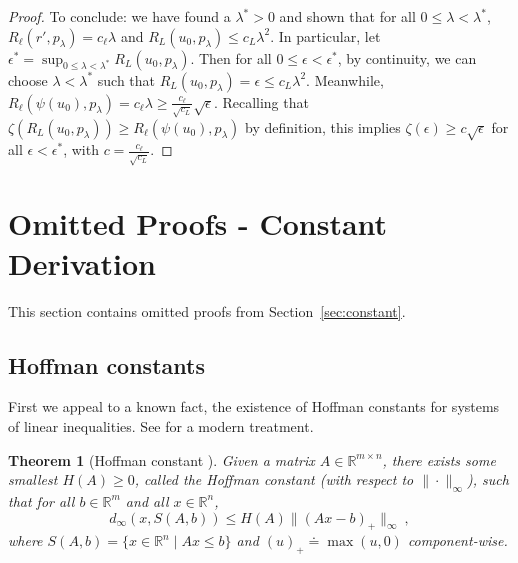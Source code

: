 \documentclass{article}
\newtheorem{theorem}{Theorem}
\theoremstyle{definition}\newtheorem{definition}{Definition}
\theoremstyle{definition}\newtheorem{assumption}{Assumption}
\newcommand{\reals}{\mathbb{R}}
\newcommand{\defeq}{\doteq}%
\begin{document}
\begin{proof}
  To conclude: we have found a $\lambda^* > 0$ and shown that for all $0 \leq \lambda < \lambda^*$, $R_\ell(r',p_\lambda) = c_\ell \lambda$ and $R_L(u_0,p_\lambda) \leq c_L \lambda^2$.
  In particular, let $\epsilon^* = \sup_{0 \leq \lambda < \lambda^*} R_L(u_0, p_{\lambda})$.
  Then for all $0 \leq \epsilon < \epsilon^*$,
  by continuity, we can choose $\lambda < \lambda^*$ such that $R_L(u_0, p_{\lambda}) = \epsilon \leq c_L \lambda^2$.
  Meanwhile, $R_{\ell}(\psi(u_0), p_{\lambda}) = c_{\ell} \lambda \geq \frac{c_{\ell}}{\sqrt{c_L}} \sqrt{\epsilon}$.
  Recalling that $\zeta(R_L(u_0, p_{\lambda})) \geq R_{\ell}(\psi(u_0), p_{\lambda})$ by definition,
  this implies $\zeta(\epsilon) \geq c \sqrt{\epsilon}$ for all $\epsilon < \epsilon^*$, with $c = \frac{c_{\ell}}{\sqrt{c_L}}$.
\end{proof}


\section{Omitted Proofs - Constant Derivation} \label{app:constant}
This section contains omitted proofs from Section~\ref{sec:constant}.

\subsection{Hoffman constants}
First we appeal to a known fact, the existence of Hoffman constants for systems of linear inequalities.
See \citet{zalinescu2003sharp} for a modern treatment.
\begin{theorem}[Hoffman constant \cite{hoffman1952approximate}]
  \label{thm:hoffman}
  Given a matrix $A\in\reals^{m\times n}$, there exists some smallest $H(A)\geq 0$, called the \emph{Hoffman constant} (with respect to $\|\cdot\|_\infty$), such that for all $b\in\reals^m$ and all $x\in\reals^n$,
  \begin{equation}
    \label{eq:hoffman}
    d_\infty(x,S(A,b)) \leq H(A) \|(A x - b)_+\|_\infty~,
  \end{equation}
  where $S(A,b) = \{x\in\reals^n \mid A x \leq b\}$ and $(u)_+ \defeq \max(u,0)$ component-wise.
\end{theorem}
\end{document}
